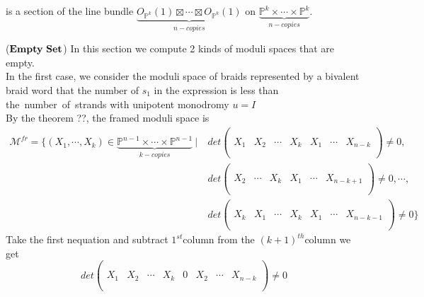 is a section of the line bundle $\underbrace{O_{\mathbb{P}^k}(1)\boxtimes\cdots \boxtimes O_{\mathbb{P}^k}(1)}_{n-copies}$ on $\underbrace{\mathbb{P}^k\times\cdots \times \mathbb{P}^k}_{n-copies}$.
\begin{example}
	($\bf{Empty~Set}$) In this section we compute 2 kinds of moduli spaces that are empty.\\
	In the first case, we consider the moduli space of braids represented by a bivalent braid word that the number of  $s_1$ in the expression is less than the~number~of~strands with unipotent monodromy $u=I$\\
By the theorem ??, the framed moduli space is 
		\begin{align*}
		\mathcal{M}^{fr}=
		\{(X_1,\cdots,X_{k}) \in 										\underbrace{\mathbb{P}^{n-1}\times \cdots \times \mathbb{P}			^{n-1}}_{k-copies}~|~		
		& det
		\left( \begin{array}{c|c|c|c|c|c|c}
			& & & & & &\\
			& & & & & &\\
			X_1&X_2&\cdots&X_{k}&X_1&\cdots& X_{n-k}\\
			& & & & & &\\
			& & & & & &
		\end{array}\right)
		\neq 0, \\
		& det
		\left( \begin{array}{c|c|c|c|c|c}
			& & & & &\\
			& & & & &\\
			X_2&\cdots&X_{k}&X_1&\cdots& X_{n-k+1}\\
			& & & & &\\
			& & & & &
		\end{array}\right)
		\neq 0,
		\cdots,\\
		& det
		\left( \begin{array}{c|c|c|c|c|c|c}
			& & & & & &\\
			& & & & & &\\
			X_k&X_1&\cdots&X_{k}&X_1&\cdots&X_{n-k-1}\\
			& & & & & &\\
			& & & & & &
		\end{array}\right)
		\neq 0
		\}
	\end{align*}
Take the first nequation and subtract $1^{st}$column from the $(k+1)^{th}$column we get
\[
	det
		\left( \begin{array}{c|c|c|c|c|c|c|c}
		&   &   &      &      & &   &                \\
		&   &   &      &      & &   &            \\
		X_1 &X_2&\cdots&X_{k} &0 &X_2&\cdots&X_{n-k}\\
		&   &   &      &      & &   &            \\
		&   &   &      &      & &   &
		\end{array}\right)
		\neq 0
\]


\end{example}
